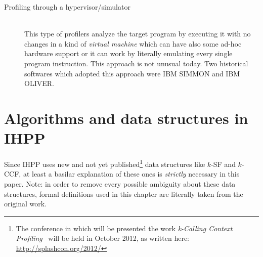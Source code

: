 \documentclass[a4paper,11pt]{report}
\begin{document}
\begin{description}
\begin{description}
\end{description} 

\item[Profiling through a hypervisor/simulator] \hfill \\
This type of profilers analyze the target program by executing it with no
changes in a kind of \emph{virtual machine} which can have also some ad-hoc
hardware support or it can work by literally emulating every single program
instruction. This approach is not unusual today. Two historical softwares
which adopted this approach were IBM SIMMON and IBM OLIVER.

\end{description}

\chapter{Algorithms and data structures in IHPP}
Since IHPP uses new and not yet published\footnote{The conference in which will be presented the work \emph{k-Calling Context
Profiling}~\cite{kccf} will be held in October 2012, as written here:
\mbox{\url{http://splashcon.org/2012/}}} data structures like $k$-SF and $k$-CCF, at least a basilar explanation of these ones is \emph{strictly} necessary in this paper. 
Note: in order to remove every possible ambiguity about these data structures, 
formal definitions used in this chapter are literally taken from the original work.
\end{document}
